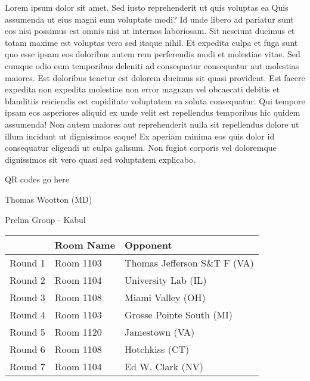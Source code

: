 \documentclass{article}%
\begin{document}
\vspace*{8pt}%
\linebreak%
\newline%
\newline%
Lorem ipsum dolor sit amet. Sed iusto reprehenderit ut quis voluptas ea Quis assumenda ut eius magni eum voluptate modi? Id unde libero ad pariatur sunt eos nisi possimus est omnis nisi ut internos laboriosam. Sit nesciunt ducimus et totam maxime est voluptas vero sed itaque nihil. Et expedita culpa et fuga sunt quo esse ipsam eos doloribus autem rem perferendis modi et molestiae vitae.\newline%
\newline%
Sed cumque odio eum temporibus deleniti ad consequatur consequatur aut molestias maiores. Est doloribus tenetur est dolorem ducimus sit quasi provident. Est facere expedita non expedita molestiae non error magnam vel obcaecati debitis et blanditiis reiciendis est cupiditate voluptatem ea soluta consequatur. Qui tempore ipsam eos asperiores aliquid ex unde velit est repellendus temporibus hic quidem assumenda!\newline%
\newline%
Non autem maiores aut reprehenderit nulla sit repellendus dolore ut illum incidunt ut dignissimos eaque! Ex aperiam minima eos quis dolor id consequatur eligendi ut culpa galisum. Non fugiat corporis vel doloremque dignissimos sit vero quasi sed voluptatem explicabo.\newline%
\newline%
%
\vspace*{30pt}%
\begin{center}%
\begin{Huge}%
QR codes go here%
\end{Huge}%
\end{center}%
\newpage%
%
\begin{center}%
\begin{Huge}%
Thomas Wootton (MD)%
\end{Huge}%
\vspace*{8pt}%
\linebreak%
\begin{Large}%
Prelim Group {-} Kabul%
\end{Large}%
\end{center}%
\begin{tabularx}{\textwidth}{|c|Y|Y|}%
\hline%
&Room Name&Opponent\\%
\hline%
Round 1&Room 1103&Thomas Jefferson S\&T F (VA)\\%
Round 2&Room 1104&University Lab (IL)\\%
Round 3&Room 1108&Miami Valley (OH)\\%
Round 4&Room 1103&Grosse Pointe South (MI)\\%
Round 5&Room 1120&Jamestown (VA)\\%
Round 6&Room 1108&Hotchkiss (CT)\\%
Round 7&Room 1104&Ed W. Clark (NV)\\%
\hline%
\end{tabularx}%
\end{document}
